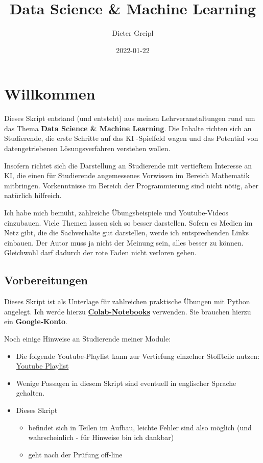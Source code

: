 \documentclass[
  oneside]{book}
\title{Data Science \& Machine Learning}
\author{Dieter Greipl}
\date{2022-01-22}
\providecommand{\tightlist}{%
  \setlength{\itemsep}{0pt}\setlength{\parskip}{0pt}}
\begin{document}
\maketitle

{
\setcounter{tocdepth}{1}
\tableofcontents
}
\hypertarget{willkommen}{%
\chapter*{Willkommen}\label{willkommen}}

Dieses Skript entstand (und entsteht) aus meinen Lehrveranstaltungen rund um das Thema \textbf{Data Science \& Machine Learning}. Die Inhalte richten sich an Studierende, die erste Schritte auf das KI -Spielfeld wagen und das Potential von datengetriebenen Lösungsverfahren verstehen wollen.

Insofern richtet sich die Darstellung an Studierende mit vertieftem Interesse an KI, die einen für Studierende angemessenes Vorwissen im Bereich Mathematik mitbringen. Vorkenntnisse im Bereich der Programmierung sind nicht nötig, aber natürlich hilfreich.

Ich habe mich bemüht, zahlreiche Übungsbeispiele und Youtube-Videos einzubauen. Viele Themen lassen sich so besser darstellen. Sofern es Medien im Netz gibt, die die Sachverhalte gut darstellen, werde ich entsprechenden Links einbauen. Der Autor muss ja nicht der Meinung sein, alles besser zu können. Gleichwohl darf dadurch der rote Faden nicht verloren gehen.

\hypertarget{vorbereitungen}{%
\section{Vorbereitungen}\label{vorbereitungen}}

Dieses Skript ist als Unterlage für zahlreichen praktische Übungen mit Python angelegt. Ich werde hierzu \href{https://colab.research.google.com/}{\textbf{Colab-Notebooks}} verwenden. Sie brauchen hierzu ein \textbf{Google-Konto}.

Noch einige Hinweise an Studierende meiner Module:

\begin{itemize}
\tightlist
\item
  Die folgende Youtube-Playlist kann zur Vertiefung einzelner Stoffteile nutzen: \href{https://youtube.com/playlist?list=PLfGN40VwjduJPvtP9QUjC0rjM6-ePT9bg}{Youtube Playlist}
\item
  Wenige Passagen in diesem Skript sind eventuell in englischer Sprache gehalten.
\item
  Dieses Skript

  \begin{itemize}
  \tightlist
  \item
    befindet sich in Teilen im Aufbau, leichte Fehler sind also möglich (und wahrscheinlich - für Hinweise bin ich dankbar)
  \item
    geht nach der Prüfung off-line
  \end{itemize}
\end{itemize}
\end{document}
